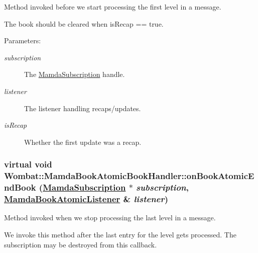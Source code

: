 Method invoked before we start processing the first level in a message. 

The book should be cleared when is\-Recap == true.

\begin{Desc}
\item[Parameters:]
\begin{description}
\item[{\em subscription}]The \hyperlink{classWombat_1_1MamdaSubscription}{Mamda\-Subscription} handle. \item[{\em listener}]The listener handling recaps/updates. \item[{\em is\-Recap}]Whether the first update was a recap. \end{description}
\end{Desc}
\hypertarget{classWombat_1_1MamdaBookAtomicBookHandler_5a19d0ed3fae6747b13cbf3789456dab}{
\subsubsection[onBookAtomicEndBook]{\setlength{\rightskip}{0pt plus 5cm}virtual void Wombat::Mamda\-Book\-Atomic\-Book\-Handler::on\-Book\-Atomic\-End\-Book (\hyperlink{classWombat_1_1MamdaSubscription}{Mamda\-Subscription} $\ast$ {\em subscription}, \hyperlink{classWombat_1_1MamdaBookAtomicListener}{Mamda\-Book\-Atomic\-Listener} \& {\em listener})}}
\label{classWombat_1_1MamdaBookAtomicBookHandler_5a19d0ed3fae6747b13cbf3789456dab}


Method invoked when we stop processing the last level in a message. 

We invoke this method after the last entry for the level gets processed. The subscription may be destroyed from this callback.

